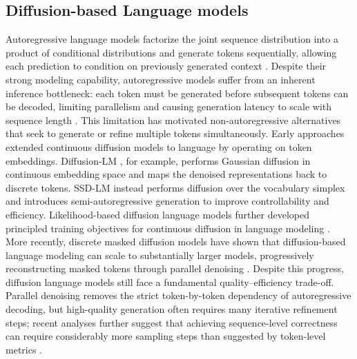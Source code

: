 \documentclass{article} %
\begin{document}
\subsection{Diffusion-based Language models}
Autoregressive language models factorize the joint sequence distribution into a product of conditional distributions and generate tokens sequentially, allowing each prediction to condition on previously generated context \citep{vaswani2017attention,gu2018nonautoregressive}. Despite their strong modeling capability, autoregressive models suffer from an inherent inference bottleneck: each token must be generated before subsequent tokens can be decoded, limiting parallelism and causing generation latency to scale with sequence length \citep{gu2018nonautoregressive,stern2018blockwise}. This limitation has motivated non-autoregressive alternatives that seek to generate or refine multiple tokens simultaneously. Early approaches extended continuous diffusion models to language by operating on token embeddings. Diffusion-LM \citep{li2022diffusion}, for example, performs Gaussian diffusion in continuous embedding space and maps the denoised representations back to discrete tokens. SSD-LM \citep{han2023ssd} instead performs diffusion over the vocabulary simplex and introduces semi-autoregressive generation to improve controllability and efficiency. Likelihood-based diffusion language models further developed principled training objectives for continuous diffusion in language modeling \citep{gulrajani2023likelihood}. More recently, discrete masked diffusion models have shown that diffusion-based language modeling can scale to substantially larger models, progressively reconstructing masked tokens through parallel denoising \citep{nie2025large, ye2025dream}. Despite this progress, diffusion language models still face a fundamental quality--efficiency trade-off. Parallel denoising removes the strict token-by-token dependency of autoregressive decoding, but high-quality generation often requires many iterative refinement steps; recent analyses further suggest that achieving sequence-level correctness can require considerably more sampling steps than suggested by token-level metrics \citep{feng2025theoretical}.
\end{document}

